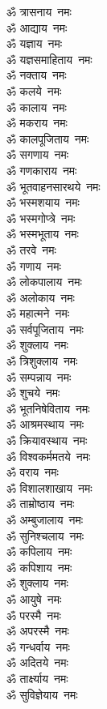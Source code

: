 \begin{multicols}{2}
\begin{flushleft}
ॐ त्रासनाय~नमः\\
ॐ आद्याय~नमः\\
ॐ यज्ञाय~नमः\\
ॐ यज्ञसमाहिताय~नमः\hfill{}\\
ॐ नक्ताय~नमः\\
ॐ कलये~नमः\\
ॐ कालाय~नमः\\
ॐ मकराय~नमः\\
ॐ कालपूजिताय~नमः\\
ॐ सगणाय~नमः\\
ॐ गणकाराय~नमः\\
ॐ भूतवाहनसारथये~नमः\\
ॐ भस्मशयाय~नमः\\
ॐ भस्मगोप्त्रे~नमः\hfill{}\\
ॐ भस्मभूताय~नमः\\
ॐ तरवे~नमः\\
ॐ गणाय~नमः\\
ॐ लोकपालाय~नमः\\
ॐ अलोकाय~नमः\\
ॐ महात्मने~नमः\\
ॐ सर्वपूजिताय~नमः\\
ॐ शुक्लाय~नमः\\
ॐ त्रिशुक्लाय~नमः\\
ॐ सम्पन्नाय~नमः\hfill{}\\
ॐ शुचये~नमः\\
ॐ भूतनिषेविताय~नमः\\
ॐ आश्रमस्थाय~नमः\\
ॐ क्रियावस्थाय~नमः\\
ॐ विश्वकर्ममतये~नमः\\
ॐ वराय~नमः\\
ॐ विशालशाखाय~नमः\\
ॐ ताम्रोष्ठाय~नमः\\
ॐ अम्बुजालाय~नमः\\
ॐ सुनिश्चलाय~नमः\hfill{}\\
ॐ कपिलाय~नमः\\
ॐ कपिशाय~नमः\\
ॐ शुक्लाय~नमः\\
ॐ आयुषे~नमः\\
ॐ परस्मै~नमः\\
ॐ अपरस्मै~नमः\\
ॐ गन्धर्वाय~नमः\\
ॐ अदितये~नमः\\
ॐ तार्क्ष्याय~नमः\\
ॐ सुविज्ञेयाय~नमः\hfill{}\\

\end{flushleft}
\end{multicols}
